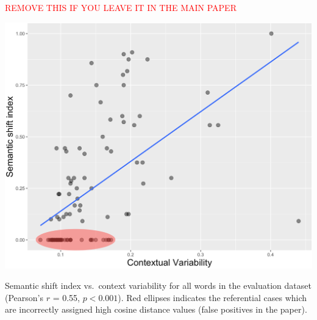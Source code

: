 \documentclass[11pt,a4paper]{article}
\begin{document}
\begin{minipage}{15cm}

\textcolor{red}{REMOVE THIS IF YOU LEAVE IT IN THE MAIN PAPER}

\includegraphics[width=\columnwidth]{images/contextual_variability_shift_index_annotated.png}

\vspace*{0.25cm}

Semantic shift index vs.~context variability for all words in the evaluation dataset (Pearson's $r$ = 0.55, $p< 0.001$). Red ellipses indicates the referential cases which are incorrectly assigned high cosine distance values (false positives in the paper).


\end{minipage}

\pagebreak

\clearpage

\end{document}
